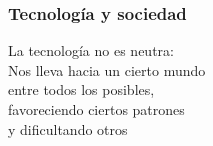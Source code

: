 \documentclass[17pt,aspectratio=169]{beamer}
\renewcommand{\secimage}{figs/bookpages}
\newcommand{\secimage}{figs/bookpages}
\begin{document}

\begin{frame}
\frametitle{Tecnología y sociedad}

{\Large
La tecnología no es neutra: \\
Nos lleva hacia un cierto mundo \\
entre todos los posibles, \\
favoreciendo ciertos patrones \\
y dificultando otros \\
}

\end{frame}






\end{document}
